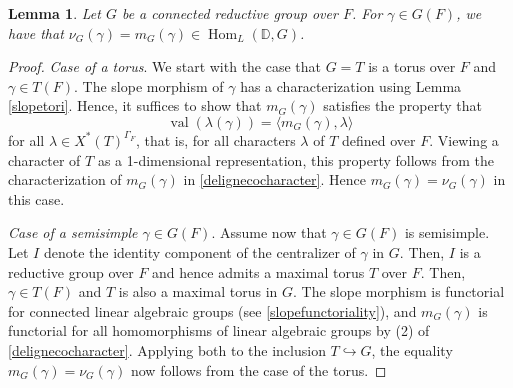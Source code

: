 \documentclass[11pt,a4paper]{article}
\theoremstyle{definition}
\theoremstyle{plain}
\newtheorem{Le}[shared]{Lemma}
\theoremstyle{remark}
\theoremstyle{plain}
\DeclareMathOperator{\Hom}{Hom}
\DeclareMathOperator{\val}{val}
\begin{document}
\begin{Le}\label{equalityofslopes}
    Let $G$ be a connected reductive group over $F$. For $\gamma \in G(F)$, we have that $\nu_G(\gamma) = m_G(\gamma) \in \Hom_L(\mathbb{D}, G)$.
\end{Le}
\begin{proof}
    \textit{Case of a torus}. We start with the case that $G = T$ is a torus over $F$ and $\gamma \in T(F)$. The slope morphism of $\gamma$ has a characterization using Lemma \ref{slopetori}. Hence, it suffices to show that $m_G(\gamma)$ satisfies the property that $$\val(\lambda(\gamma)) = \langle m_G(\gamma), \lambda \rangle$$ for all $\lambda \in X^*(T)^{\Gamma_F}$, that is, for all characters $\lambda$ of $T$ defined over $F$. Viewing a character of $T$ as a 1-dimensional representation, this property follows from the characterization of $m_G(\gamma)$ in \ref{delignecocharacter}. Hence $m_G(\gamma) = \nu_G(\gamma)$ in this case.
    
    \textit{Case of a semisimple $\gamma \in G(F)$}. Assume now that $\gamma \in G(F)$ is semisimple. Let $I$ denote the identity component of the centralizer of $\gamma$ in $G$. Then, $I$ is a reductive group over $F$ and hence admits a maximal torus $T$ over $F$. Then, $\gamma \in T(F)$ and $T$ is also a maximal torus in $G$. The slope morphism is functorial for connected linear algebraic groups (see \ref{slopefunctoriality}), and $m_G(\gamma)$ is functorial for all homomorphisms of linear algebraic groups by (2) of \ref{delignecocharacter}. Applying both to the inclusion $T \hookrightarrow G$, the equality $m_G(\gamma) = \nu_G(\gamma)$ now follows from the case of the torus.


\end{proof}
\end{document}
